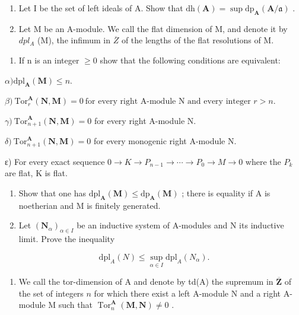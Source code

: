 \begin{enumerate}
\def\labelenumi{\arabic{enumi})}
\setcounter{enumi}{5}
\item
  Let I be the set of left ideals of A. Show that \(\mathrm{dh}(\mathbf{A}) = \sup \mathrm{dp}_{\mathbf{A}}(\mathbf{A}/\mathfrak{a})\) .
\item
  Let M be an A-module. We call the flat dimension of M, and denote it by \(dpl_{A}\) (M), the infimum in \(\overline{Z}\) of the lengths of the flat resolutions of M.
\end{enumerate}

\begin{enumerate}
\def\labelenumi{\alph{enumi})}
\tightlist
\item
  If n is an integer \(\geqslant 0\) show that the following conditions are equivalent:
\end{enumerate}

\(\alpha)\mathrm{dpl}_{\mathbf{A}}(\mathbf{M})\leqslant n.\)

\(\beta)\ \mathrm{Tor}_{r}^{\mathbf{A}}(\mathbf{N},\mathbf{M})=0\ \text{for every right A-module N and every integer }r>n.\)

\(\gamma)\ \mathrm{Tor}_{n+1}^{\mathbf{A}}(\mathbf{N},\mathbf{M})=0\) for every right A-module N.

\(\delta)\ \mathrm{Tor}_{n+1}^{\mathbf{A}}(\mathbf{N},\mathbf{M})=0\) for every monogenic right A-module N.

ε) For every exact sequence \(0 \rightarrow K \rightarrow P_{n-1} \rightarrow \cdots \rightarrow P_{0} \rightarrow M \rightarrow 0\) where the \(P_{k}\) are flat, K is flat.

\begin{enumerate}
\def\labelenumi{\alph{enumi})}
\setcounter{enumi}{1}
\item
  Show that one has \(\mathrm{dpl}_{\mathbf{A}}(\mathbf{M}) \leqslant \mathrm{dp}_{\mathbf{A}}(\mathbf{M})\) ; there is equality if A is noetherian and M is finitely generated.
\item
  Let \((\mathbf{N}_{\alpha})_{\alpha \in I}\) be an inductive system of A-modules and N its inductive limit. Prove the inequality
\end{enumerate}

\[
\mathrm{dpl} _ {A} (N) \leqslant \sup _ {\alpha \in I} \mathrm{dpl} _ {A} (N _ {\alpha}).
\]

\begin{enumerate}
\def\labelenumi{\arabic{enumi})}
\setcounter{enumi}{7}
\tightlist
\item
  We call the tor-dimension of A and denote by td(A) the supremum in \(\overline{\mathbf{Z}}\) of the set of integers \(n\) for which there exist a left A-module N and a right A-module M such that \(\operatorname{Tor}_{n}^{\mathbf{A}}(\mathbf{M},\mathbf{N})\neq0\) .
\end{enumerate}

